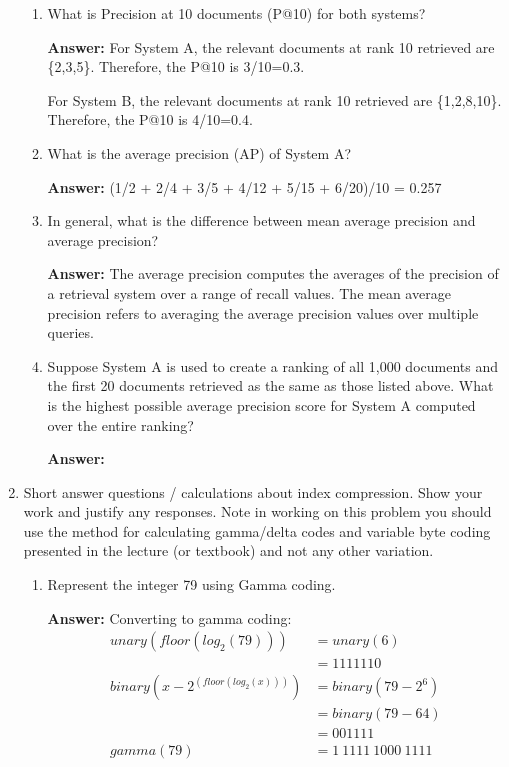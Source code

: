 \documentclass[11pt]{article}
\begin{document}
\begin{enumerate}
\begin{enumerate}
          \item What is Precision at 10 documents (P@10) for both systems?

                \textbf{Answer:} For System A, the relevant documents at rank 10 retrieved are \{2,3,5\}. Therefore, the P@10 is 3/10=0.3.

                For System B, the relevant documents at rank 10 retrieved are \{1,2,8,10\}. Therefore, the P@10 is 4/10=0.4.

          \item What is the average precision (AP) of System A?

                \textbf{Answer:} (1/2 + 2/4 + 3/5 + 4/12 + 5/15 + 6/20)/10 = 0.257

          \item In general, what is the difference between mean average precision and average precision?

                \textbf{Answer:} The average precision computes the averages of the precision of a retrieval system over a range of recall values. The mean average precision refers to averaging the average precision values over multiple queries.

          \item Suppose System A is used to create a ranking of all 1,000 documents and the first 20 documents retrieved as the same as those listed above. What is the highest possible average precision score for System A computed over the entire ranking?

                \textbf{Answer:}

        \end{enumerate}

  \item Short answer questions / calculations about index compression. Show your work and justify any responses.
        Note in working on this problem you should use the method for calculating gamma/delta codes and variable
        byte coding presented in the lecture (or textbook) and not any other variation.
        \begin{enumerate}
          \item Represent the integer 79 using Gamma coding.

                \textbf{Answer:} Converting to gamma coding:
                \begin{align*}
                  unary(floor(log_2(79)))         & = unary(6)               \\
                                                  & = 1111110                \\
                  binary(x-2^{(floor(log_2(x)))}) & = binary(79 - 2^6)       \\
                                                  & = binary(79 - 64)        \\
                                                  & = 001111                 \\
                  gamma(79)                       & = 1 \ 1111 \ 1000 \ 1111
                \end{align*}



\end{enumerate}
\end{enumerate}
\end{document}
